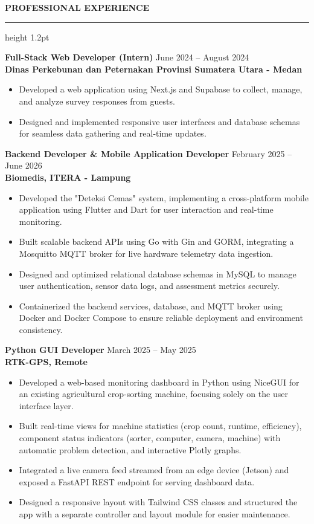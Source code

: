 \documentclass[11pt,a4paper]{article}
\newcommand{\secfontsize}{14}
\newcommand{\seclineheight}{1.2pt}
\newcommand{\secgapabove}{14pt}
\newcommand{\secgaptitle}{6pt}
\newcommand{\secgapbelow}{10pt}
\newcommand{\company}[1]{\textbf{\textcolor{accent}{#1}}}
\newcommand{\cvsection}[1]{%
    \par\vspace{\secgapabove}%
    {\fontsize{\secfontsize}{\numexpr\secfontsize+3\relax}\selectfont\bfseries\scshape #1}\par
    \vspace{\secgaptitle}%
    {\color{black}\hrule height \seclineheight}%
    \vspace{\secgapbelow}%
    \noindent\ignorespaces
}
\begin{document}
\cvsection{PROFESSIONAL EXPERIENCE}

\textbf{Full-Stack Web Developer (Intern)}
\hfill
June 2024 -- August 2024 \\
\company{Dinas Perkebunan dan Peternakan Provinsi Sumatera Utara - Medan}
\begin{itemize}
\item Developed a web application using Next.js and Supabase to collect, manage, and analyze survey responses from guests.
\item Designed and implemented responsive user interfaces and database schemas for seamless data gathering and real-time updates.
\end{itemize}

\vspace{8pt}

\textbf{Backend Developer \& Mobile Application Developer}
\hfill
February 2025 -- June 2026 \\
\company{Biomedis, ITERA - Lampung}
\begin{itemize}
    \item Developed the "Deteksi Cemas" system, implementing a cross-platform mobile application using Flutter and Dart for user interaction and real-time monitoring.
    \item Built scalable backend APIs using Go with Gin and GORM, integrating a Mosquitto MQTT broker for live hardware telemetry data ingestion.
    \item Designed and optimized relational database schemas in MySQL to manage user authentication, sensor data logs, and assessment metrics securely.
    \item Containerized the backend services, database, and MQTT broker using Docker and Docker Compose to ensure reliable deployment and environment consistency.
\end{itemize}

\vspace{8pt}

\textbf{Python GUI Developer}
\hfill
March 2025 -- May 2025 \\
\company{RTK-GPS, Remote}
\begin{itemize}
\item Developed a web-based monitoring dashboard in Python using NiceGUI for an existing agricultural crop-sorting machine, focusing solely on the user interface layer.
\item Built real-time views for machine statistics (crop count, runtime, efficiency), component status indicators (sorter, computer, camera, machine) with automatic problem detection, and interactive Plotly graphs.
\item Integrated a live camera feed streamed from an edge device (Jetson) and exposed a FastAPI REST endpoint for serving dashboard data.
\item Designed a responsive layout with Tailwind CSS classes and structured the app with a separate controller and layout module for easier maintenance.
\end{itemize}
\end{document}
